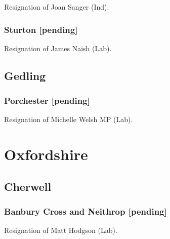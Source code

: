 \documentclass[a4paper,openany]{book}
\begin{document}
\begin{resultsiii}

Resignation of Joan Sanger (Ind).

\subsubsection*{Sturton \hspace*{\fill}\nolinebreak[1]%
	\enspace\hspace*{\fill}
	[pending]}


Resignation of James Naish (Lab).

\subsection*{Gedling}

\subsubsection*{Porchester \hspace*{\fill}\nolinebreak[1]%
	\enspace\hspace*{\fill}
	[pending]}


Resignation of Michelle Welsh MP (Lab).

\section{Oxfordshire}

\subsection*{Cherwell}

\subsubsection*{Banbury Cross and Neithrop \hspace*{\fill}\nolinebreak[1]%
	\enspace\hspace*{\fill}
	[pending]}


Resignation of Matt Hodgson (Lab).


\end{resultsiii}
\end{document}

